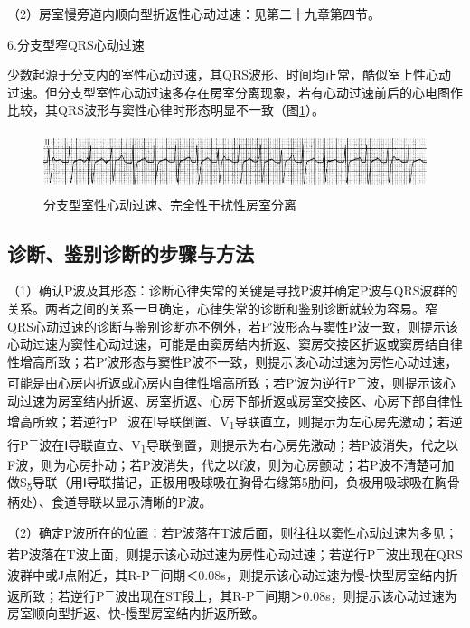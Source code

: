 （2）房室慢旁道内顺向型折返性心动过速：见第二十九章第四节。

6.分支型窄QRS心动过速

少数起源于分支内的室性心动过速，其QRS波形、时间均正常，酷似室上性心动过速。但分支型室性心动过速多存在房室分离现象，若有心动过速前后的心电图作比较，其QRS波形与窦性心律时形态明显不一致（图\ref{fig32-12}）。

\begin{figure}[!htbp]
 \centering
 \includegraphics[width=5.58333in,height=0.6875in]{./images/Image00528.jpg}
 \captionsetup{justification=centering}
 \caption{分支型室性心动过速、完全性干扰性房室分离}
 \label{fig32-12}
  \end{figure} 

\protect\hypertarget{text00039.htmlux5cux23subid441}{}{}

\subsection{诊断、鉴别诊断的步骤与方法}

（1）确认P波及其形态：诊断心律失常的关键是寻找P波并确定P波与QRS波群的关系。两者之间的关系一旦确定，心律失常的诊断和鉴别诊断就较为容易。窄QRS心动过速的诊断与鉴别诊断亦不例外，若P′波形态与窦性P波一致，则提示该心动过速为窦性心动过速，可能是由窦房结内折返、窦房交接区折返或窦房结自律性增高所致；若P′波形态与窦性P波不一致，则提示该心动过速为房性心动过速，可能是由心房内折返或心房内自律性增高所致；若P′波为逆行P\textsuperscript{－}波，则提示该心动过速为房室结内折返、房室折返、心房下部折返或房室交接区、心房下部自律性增高所致；若逆行P\textsuperscript{－}波在Ⅰ导联倒置、V\textsubscript{1}导联直立，则提示为左心房先激动；若逆行P\textsuperscript{－}波在Ⅰ导联直立、V\textsubscript{1}导联倒置，则提示为右心房先激动；若P波消失，代之以F波，则为心房扑动；若P波消失，代之以f波，则为心房颤动；若P波不清楚可加做S\textsubscript{5}导联（用Ⅰ导联描记，正极用吸球吸在胸骨右缘第5肋间，负极用吸球吸在胸骨柄处）、食道导联以显示清晰的P波。

（2）确定P波所在的位置：若P波落在T波后面，则往往以窦性心动过速为多见；若P波落在T波上面，则提示该心动过速为房性心动过速；若逆行P\textsuperscript{－}波出现在QRS波群中或J点附近，其R-P\textsuperscript{－}间期＜0.08s，则提示该心动过速为慢-快型房室结内折返所致；若逆行P\textsuperscript{－}波出现在ST段上，其R-P\textsuperscript{－}间期＞0.08s，则提示该心动过速为房室顺向型折返、快-慢型房室结内折返所致。

